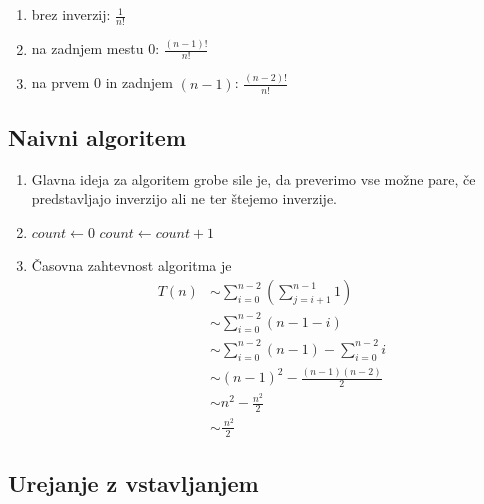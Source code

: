 \documentclass[11pt,a4paper]{article}
\theoremstyle{plain}
\theoremstyle{definition}
\begin{document}
\subsection{}

\begin{enumerate}[label=\alph*)]
\item brez inverzij: $\frac{1}{n!}$
\item na zadnjem mestu 0: $\frac{(n-1)!}{n!}$
\item na prvem 0 in zadnjem $(n-1)$: $\frac{(n-2)!}{n!}$
\end{enumerate}

\subsection{Naivni algoritem}

\begin{enumerate}[label=\alph*)]
\item
Glavna ideja za algoritem grobe sile je, da preverimo vse možne pare, če predstavljajo inverzijo ali ne ter štejemo inverzije.

\item
\begin{algorithmic}
\State $count \gets 0$
            \State $count \gets count + 1$
        \EndIf
    \EndFor
\EndFor
{}
\end{algorithmic}

\item
Časovna zahtevnost algoritma je
\begin{align*}
T(n) &\sim \sum_{i=0}^{n-2} \left( \sum_{j=i+1}^{n-1} 1 \right) \\
     &\sim \sum_{i=0}^{n-2} \left( n - 1 - i \right) \\
     &\sim \sum_{i=0}^{n-2} \left( n-1 \right) - \sum_{i=0}^{n-2} i \\
     &\sim (n-1)^2 - \frac{(n-1) (n-2)}{2} \\
     &\sim n^2 - \frac{n^2}{2} \\
     &\sim \frac{\ n^2}{2}
\end{align*}

\end{enumerate}

\subsection{Urejanje z vstavljanjem}
\end{document}
